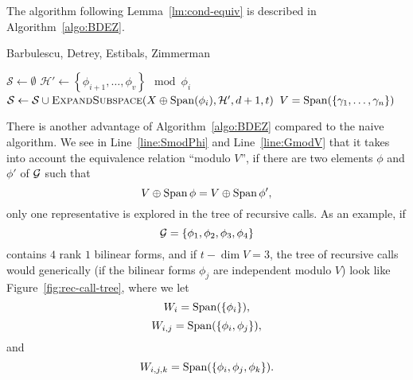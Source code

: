 The algorithm following Lemma~\ref{lm:cond-equiv} is described in
Algorithm~\ref{algo:BDEZ}.
\begin{algorithm}
  \caption{Barbulescu, Detrey, Estibals, Zimmerman}
  \label{algo:BDEZ}
  \begin{algorithmic}[1]

    \State {}
    \Else
    \State $\mathcal S\gets\emptyset$
      \State\label{line:SmodPhi} $\mathcal H'\gets \left\{ \phi_{i+1}, \dots, \phi_v
  \right\}\mod\phi_i$
    \State $\mathcal S\gets\mathcal
    S\cup\Call{ExpandSubspace}{X\oplus\Span(\phi_i), \mathcal H', d+1, t}$
    \EndFor
    \State {}
    \EndIf
    \EndFunction
    \State $V=\operatorname{Span}(\left\{ \gamma_1, \dots, \gamma_n \right\})$
    \State\label{line:GmodV} 
  \end{algorithmic}
\end{algorithm}
There is another advantage of Algorithm~\ref{algo:BDEZ} compared to the naive
algorithm. We see in Line~\ref{line:SmodPhi} and Line~\ref{line:GmodV} that it
takes into account the equivalence relation ``modulo $V$'', \ie if there are two
elements $\phi$ and $\phi'$ of $\mathcal{G}$ such that 
\[
  V\oplus\operatorname{Span}\phi=V\oplus\operatorname{Span}\phi',
\]
only one representative is explored in the tree of recursive calls. As an
example, if
\[
  \mathcal{G} = \left\{ \phi_1, \phi_2, \phi_3, \phi_4 \right\}
\]
contains $4$ rank $1$ bilinear forms, and if $t - \dim V = 3$, the tree of
recursive calls would generically (\eg if the bilinear forms $\phi_j$ are
independent modulo $V$) look like Figure~\ref{fig:rec-call-tree}, where we let
\[
  W_{i} = \operatorname{Span}(\left\{ \phi_i\right\}),
\]
\[
  W_{i, j} = \operatorname{Span}(\left\{ \phi_i, \phi_j\right\}),
\]
and
\[
  W_{i, j, k} = \operatorname{Span}(\left\{ \phi_i, \phi_j, \phi_k \right\}).
\]
